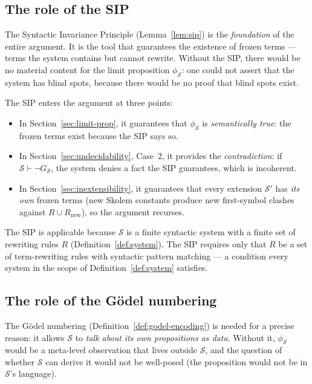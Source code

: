 \documentclass[11pt]{article}
\begin{document}
\subsection{The role of the SIP}

The Syntactic Invariance Principle (Lemma~\ref{lem:sip}) is the
\emph{foundation} of the entire argument. It is the tool that guarantees
the existence of frozen terms --- terms the system contains but cannot
rewrite. Without the SIP, there would be no material content for the
limit proposition $\phi_{\mathcal{S}}$: one could not assert that the
system has blind spots, because there would be no proof that blind spots
exist.

The SIP enters the argument at three points:
\begin{itemize}
  \item In Section~\ref{sec:limit-prop}, it guarantees that
        $\phi_{\mathcal{S}}$ is \emph{semantically true}: the frozen
        terms exist because the SIP says so.
  \item In Section~\ref{sec:undecidability}, Case~2, it provides the
        \emph{contradiction}: if $\mathcal{S} \vdash \neg
        G_{\mathcal{S}}$, the system denies a fact the SIP guarantees,
        which is incoherent.
  \item In Section~\ref{sec:inextensibility}, it guarantees that every
        extension $\mathcal{S}'$ has \emph{its own} frozen terms (new
        Skolem constants produce new first-symbol clashes against
        $R \cup R_{\mathrm{new}}$), so the argument recurses.
\end{itemize}

The SIP is applicable because $\mathcal{S}$ is a finite syntactic
system with a finite set of rewriting rules $R$
(Definition~\ref{def:system}). The SIP requires only that $R$ be a set
of term-rewriting rules with syntactic pattern matching --- a condition
every system in the scope of Definition~\ref{def:system} satisfies.

\subsection{The role of the G\"odel numbering}

The G\"odel numbering (Definition~\ref{def:godel-encoding}) is needed
for a precise reason: it allows $\mathcal{S}$ to \emph{talk about its
own propositions as data}. Without it, $\phi_{\mathcal{S}}$ would be a
meta-level observation that lives outside $\mathcal{S}$, and the
question of whether $\mathcal{S}$ can derive it would not be
well-posed (the proposition would not be in $\mathcal{S}$'s language).
\end{document}
